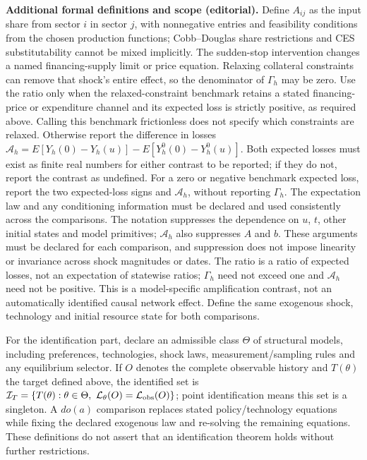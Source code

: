 \documentclass[11pt,a4paper]{article}
\begin{document}
\textbf{Additional formal definitions and scope (editorial).} Define \(A_{ij}\) as the input share from sector \(i\) in sector \(j\), with nonnegative entries and feasibility conditions from the chosen production functions; Cobb--Douglas share restrictions and CES substitutability cannot be mixed implicitly. The sudden-stop intervention changes a named financing-supply limit or price equation. Relaxing collateral constraints can remove that shock's entire effect, so the denominator of \(\Gamma_h\) may be zero. Use the ratio only when the relaxed-constraint benchmark retains a stated financing-price or expenditure channel and its expected loss is strictly positive, as required above. Calling this benchmark frictionless does not specify which constraints are relaxed. Otherwise report the difference in losses \(\mathcal A_h=E[Y_h(0)-Y_h(u)]-E[Y_h^0(0)-Y_h^0(u)]\). Both expected losses must exist as finite real numbers for either contrast to be reported; if they do not, report the contrast as undefined. For a zero or negative benchmark expected loss, report the two expected-loss signs and \(\mathcal A_h\), without reporting \(\Gamma_h\). The expectation law and any conditioning information must be declared and used consistently across the comparisons. The notation suppresses the dependence on \(u\), \(t\), other initial states and model primitives; \(\mathcal A_h\) also suppresses \(A\) and \(b\). These arguments must be declared for each comparison, and suppression does not impose linearity or invariance across shock magnitudes or dates. The ratio is a ratio of expected losses, not an expectation of statewise ratios; \(\Gamma_h\) need not exceed one and \(\mathcal A_h\) need not be positive. This is a model-specific amplification contrast, not an automatically identified causal network effect. Define the same exogenous shock, technology and initial resource state for both comparisons.

For the identification part, declare an admissible class \(\Theta\) of structural models, including preferences, technologies, shock laws, measurement/sampling rules and any equilibrium selector. If \(O\) denotes the complete observable history and \(T(\theta)\) the target defined above, the identified set is \(\mathcal I_T=\{T(\theta):\theta\in\Theta,\ \mathcal L_\theta(O)=\mathcal L_{\rm obs}(O)\}\); point identification means this set is a singleton. A \(do(a)\) comparison replaces stated policy/technology equations while fixing the declared exogenous law and re-solving the remaining equations. These definitions do not assert that an identification theorem holds without further restrictions.
\end{document}
